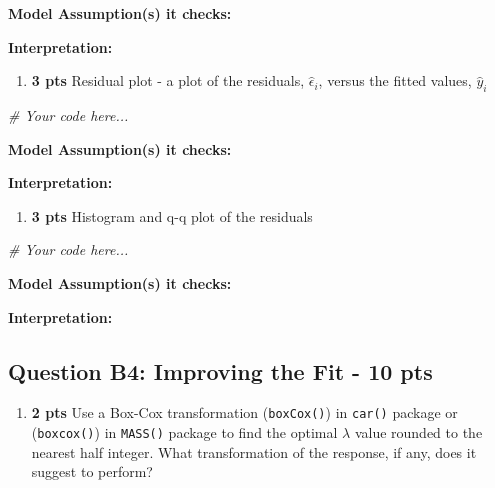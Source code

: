 \documentclass[
]{article}
\newenvironment{Shaded}{\begin{snugshade}}{\end{snugshade}}
\newcommand{\CommentTok}[1]{\textcolor[rgb]{0.56,0.35,0.01}{\textit{#1}}}
\providecommand{\tightlist}{%
  \setlength{\itemsep}{0pt}\setlength{\parskip}{0pt}}
\begin{document}
\textbf{Model Assumption(s) it checks:}

\textbf{Interpretation:}

\begin{enumerate}
\def\labelenumi{\alph{enumi}.}
\setcounter{enumi}{1}
\tightlist
\item
  \textbf{3 pts} Residual plot - a plot of the residuals,
  \(\hat\epsilon_i\), versus the fitted values, \(\hat{y}_i\)
\end{enumerate}

\begin{Shaded}
\begin{Highlighting}[]
\CommentTok{\# Your code here...}
\end{Highlighting}
\end{Shaded}

\textbf{Model Assumption(s) it checks:}

\textbf{Interpretation:}

\begin{enumerate}
\def\labelenumi{\alph{enumi}.}
\setcounter{enumi}{2}
\tightlist
\item
  \textbf{3 pts} Histogram and q-q plot of the residuals
\end{enumerate}

\begin{Shaded}
\begin{Highlighting}[]
\CommentTok{\# Your code here...}
\end{Highlighting}
\end{Shaded}

\textbf{Model Assumption(s) it checks:}

\textbf{Interpretation:}

\hypertarget{question-b4-improving-the-fit---10-pts}{%
\subsection{Question B4: Improving the Fit - 10
pts}\label{question-b4-improving-the-fit---10-pts}}

\begin{enumerate}
\def\labelenumi{\alph{enumi}.}
\tightlist
\item
  \textbf{2 pts} Use a Box-Cox transformation (\texttt{boxCox()}) in
  \texttt{car()} package or (\texttt{boxcox()}) in \texttt{MASS()}
  package to find the optimal \(\lambda\) value rounded to the nearest
  half integer. What transformation of the response, if any, does it
  suggest to perform?
\end{enumerate}
\end{document}

